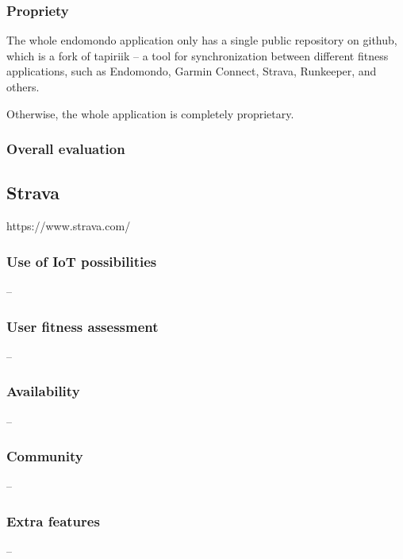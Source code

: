 \subsubsection*{Propriety}
The whole endomondo application only has a single public repository on github, which is a fork of tapiriik -- a tool for synchronization between different fitness applications, such as Endomondo, Garmin Connect, Strava, Runkeeper, and others.\cite{endomondo-tampiriik}

Otherwise, the whole application is completely proprietary.
\subsubsection*{Overall evaluation}
\subsection{Strava}
https://www.strava.com/
\subsubsection*{Use of IoT possibilities} --
\subsubsection*{User fitness assessment} --
\subsubsection*{Availability} --
\subsubsection*{Community} -- 
\subsubsection*{Extra features} -- 
